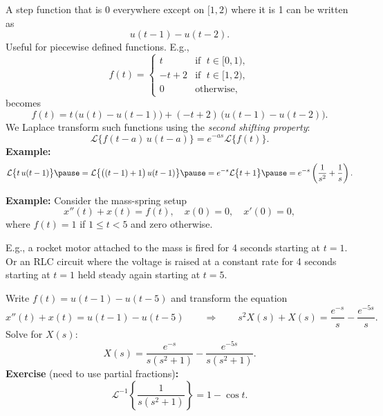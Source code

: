 \documentclass[10pt,aspectratio=169]{beamer}
\begin{document}
\begin{frame}
A step function that is $0$ everywhere except on $[1,2)$ where it is 1
can be written as
\[
u(t - 1) - u(t-2) .
\]
\pause
Useful for piecewise defined functions.  E.g.,
\[
f(t) =
\begin{cases}
t & \text{if } \; t \in [0,1) , \\ 
-t+2 & \text{if } \; t \in [1,2), \\
0 & \text{otherwise} ,
\end{cases}
\]
becomes
\[
f(t) = t \, \bigl( u(t) - u(t-1) \bigr) + 
(-t+2) \, \bigl( u(t - 1) - u(t-2) \bigr) .
\]
\pause
We Laplace transform such functions using the \emph{second shifting property}:
\[
\mathcal{L} \bigl\{ f(t-a) \, u(t-a) \bigr\}
= e^{-as} \mathcal{L} \bigl\{ f(t) \bigr\} .
\]
\pause
\textbf{Example:}
\[
\mathcal{L} \bigl\{ t \, u(t-1) \bigr\}
\pause
=
\mathcal{L} \bigl\{ \bigl( (t-1) + 1\bigr) \, u(t-1) \bigr\}
\pause
= e^{-s} \mathcal{L} \bigl\{ t+1 \bigr\}
\pause
= e^{-s} \left(\frac{1}{s^2} + \frac{1}{s} \right)
.
\]
\end{frame}

\begin{frame}
\textbf{Example:}
Consider the mass-spring setup
\begin{equation*}
x''(t) + x(t) = f(t) , \quad x(0) = 0, \quad x'(0) = 0,
\end{equation*}
where $f(t) = 1$ if $1 \leq t < 5$ and zero otherwise.

\pause
\medskip

E.g., a rocket motor attached to the mass is fired for 4 seconds starting at
$t=1$. \pause  Or an RLC circuit where the voltage is raised
at a constant rate for 4 seconds starting at $t=1$ held steady 
again starting at $t=5$.

\pause
\medskip

Write $f(t) = u(t-1) - u(t-5)$ and transform the equation
\[
x''(t) + x(t) = 
u(t-1) - u(t-5)
\qquad
\Rightarrow
\qquad
s^2 X(s) + X(s) = \frac{e^{-s}}{s} - \frac{e^{-5s}}{s} .
\]
\pause
Solve for $X(s)$:
\[
X(s) = \frac{e^{-s}}{s(s^2+1)} - \frac{e^{-5s}}{s(s^2+1)} .
\]
\pause
\textbf{Exercise} (need to use partial fractions)\textbf{:}
\begin{equation*}
{\mathcal{L}}^{-1} \left\{ \frac{1}{s(s^2+1)} \right\}
= 1 - \cos t .
\end{equation*}
\end{frame}
\end{document}
